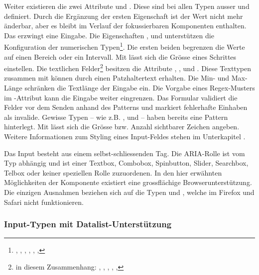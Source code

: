 Weiter existieren die zwei Attribute  und . 
Diese sind bei allen Typen ausser  und  definiert. 
Durch die Ergänzung der ersten Eigenschaft ist der Wert nicht mehr änderbar, aber es bleibt im Verlauf der fokussierbaren Komponenten enthalten. 
Das  erzwingt eine Eingabe. 
Die Eigenschaften ,  und  unterstützen die Konfiguration der numerischen Typen\footnote{
    , , , , , , 
}. 
Die ersten beiden begrenzen die Werte auf einen Bereich oder ein Intervall. 
Mit  lässt sich die Grösse eines Schrittes einstellen. 
Die textlichen Felder\footnote{
    in diesem Zusammenhang: , , , , , 
} besitzen die Attribute , ,  und . 
Diese Texttypen zusammen mit  können durch  einen Patzhaltertext erhalten. 
Die Min- und Max-Länge schränken die Textlänge der Eingabe ein. 
Die Vorgabe eines Regex-Musters im -Attribut kann die Eingabe weiter eingrenzen. 
Das Formular validiert die Felder vor dem Senden anhand des Patterns und markiert fehlerhafte Einhaben als invalide. 
Gewisse Typen – wie z.B. ,  und  – haben bereits eine Pattern hinterlegt. 
Mit  lässt sich die Grösse bzw. Anzahl sichtbarer Zeichen angeben. 
Weitere Informationen zum Styling eines Input-Feldes stehen im Unterkapitel \textbf{}. 

Das Input besteht aus einem selbst-schliessenden Tag. 
Die ARIA-Rolle ist vom Typ abhängig und ist einer Textbox, Combobox, Spinbutton, Slider, Searchbox, Telbox oder keiner speziellen Rolle zuzuordenen.  
In den hier erwähnten Möglichkeiten der Komponente existiert eine grossflächige Browserunterstützung. 
Die einzigen Ausnahmen beziehen sich auf die Typen  und , welche im Firefox und Safari nicht funktionieren. 


\subsubsection{{\color{dgray} Input-Typen mit Datalist-Unterstützung}}
\label{sec:inputTypesDatalist}

